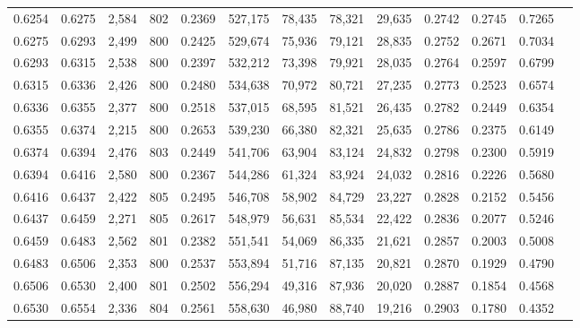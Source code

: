 \begin{tabular}{rrrrrrrrrrrrr}
0.6254 & 0.6275 &  2,584 & 802 &                                     0.2369 & 527,175 &  78,435 &  78,321 &  29,635 & 0.2742 & 0.2745 & 0.7265 \\
0.6275 & 0.6293 &  2,499 & 800 &                                     0.2425 & 529,674 &  75,936 &  79,121 &  28,835 & 0.2752 & 0.2671 & 0.7034 \\
0.6293 & 0.6315 &  2,538 & 800 &                                     0.2397 & 532,212 &  73,398 &  79,921 &  28,035 & 0.2764 & 0.2597 & 0.6799 \\
0.6315 & 0.6336 &  2,426 & 800 &                                     0.2480 & 534,638 &  70,972 &  80,721 &  27,235 & 0.2773 & 0.2523 & 0.6574 \\
0.6336 & 0.6355 &  2,377 & 800 &                                     0.2518 & 537,015 &  68,595 &  81,521 &  26,435 & 0.2782 & 0.2449 & 0.6354 \\
0.6355 & 0.6374 &  2,215 & 800 &                                     0.2653 & 539,230 &  66,380 &  82,321 &  25,635 & 0.2786 & 0.2375 & 0.6149 \\
0.6374 & 0.6394 &  2,476 & 803 &                                     0.2449 & 541,706 &  63,904 &  83,124 &  24,832 & 0.2798 & 0.2300 & 0.5919 \\
0.6394 & 0.6416 &  2,580 & 800 &                                     0.2367 & 544,286 &  61,324 &  83,924 &  24,032 & 0.2816 & 0.2226 & 0.5680 \\
0.6416 & 0.6437 &  2,422 & 805 &                                     0.2495 & 546,708 &  58,902 &  84,729 &  23,227 & 0.2828 & 0.2152 & 0.5456 \\
0.6437 & 0.6459 &  2,271 & 805 &                                     0.2617 & 548,979 &  56,631 &  85,534 &  22,422 & 0.2836 & 0.2077 & 0.5246 \\
0.6459 & 0.6483 &  2,562 & 801 &                                     0.2382 & 551,541 &  54,069 &  86,335 &  21,621 & 0.2857 & 0.2003 & 0.5008 \\
0.6483 & 0.6506 &  2,353 & 800 &                                     0.2537 & 553,894 &  51,716 &  87,135 &  20,821 & 0.2870 & 0.1929 & 0.4790 \\
0.6506 & 0.6530 &  2,400 & 801 &                                     0.2502 & 556,294 &  49,316 &  87,936 &  20,020 & 0.2887 & 0.1854 & 0.4568 \\
0.6530 & 0.6554 &  2,336 & 804 &                                     0.2561 & 558,630 &  46,980 &  88,740 &  19,216 & 0.2903 & 0.1780 & 0.4352 \\

\end{tabular}
